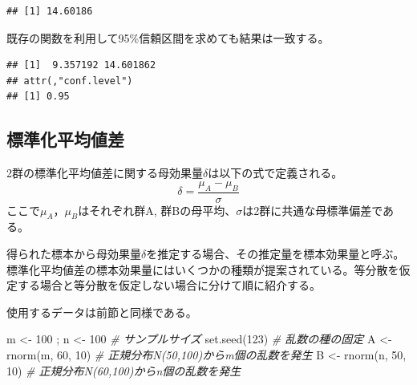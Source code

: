 \documentclass[
  ja=standard, xelatex, base=12pt]{bxjsreport}
\newenvironment{Shaded}{\begin{snugshade}}{\end{snugshade}}
\newcommand{\AttributeTok}[1]{\textcolor[rgb]{0.77,0.63,0.00}{#1}}
\newcommand{\CommentTok}[1]{\textcolor[rgb]{0.56,0.35,0.01}{\textit{#1}}}
\newcommand{\DecValTok}[1]{\textcolor[rgb]{0.00,0.00,0.81}{#1}}
\newcommand{\FunctionTok}[1]{\textcolor[rgb]{0.00,0.00,0.00}{#1}}
\newcommand{\NormalTok}[1]{#1}
\newcommand{\OtherTok}[1]{\textcolor[rgb]{0.56,0.35,0.01}{#1}}
\newcommand{\SpecialCharTok}[1]{\textcolor[rgb]{0.00,0.00,0.00}{#1}}
\begin{document}
\begin{verbatim}
## [1] 14.60186
\end{verbatim}

既存の関数を利用して95\%信頼区間を求めても結果は一致する。

\begin{Shaded}
\end{Shaded}

\begin{verbatim}
## [1]  9.357192 14.601862
## attr(,"conf.level")
## [1] 0.95
\end{verbatim}

\hypertarget{ux6a19ux6e96ux5316ux5e73ux5747ux5024ux5dee-2}{%
\subsection{標準化平均値差}\label{ux6a19ux6e96ux5316ux5e73ux5747ux5024ux5dee-2}}

2群の標準化平均値差に関する母効果量\(\delta\)は以下の式で定義される。 \[
\delta=\frac{μ_A-μ_B}{σ}
\]ここで\(μ_A\)，\(μ_B\)はそれぞれ群A, 群Bの母平均、\(σ\)は2群に共通な母標準偏差である。

得られた標本から母効果量\(\delta\)を推定する場合、その推定量を標本効果量と呼ぶ。 標準化平均値差の標本効果量にはいくつかの種類が提案されている。等分散を仮定する場合と等分散を仮定しない場合に分けて順に紹介する。

使用するデータは前節と同様である。

\begin{Shaded}
\begin{Highlighting}[]
\NormalTok{m }\OtherTok{\textless{}{-}} \DecValTok{100}\NormalTok{ ; n }\OtherTok{\textless{}{-}} \DecValTok{100}   \CommentTok{\# サンプルサイズ}
\FunctionTok{set.seed}\NormalTok{(}\DecValTok{123}\NormalTok{)         }\CommentTok{\# 乱数の種の固定}
\NormalTok{A }\OtherTok{\textless{}{-}} \FunctionTok{rnorm}\NormalTok{(m, }\DecValTok{60}\NormalTok{, }\DecValTok{10}\NormalTok{) }\CommentTok{\# 正規分布N(50,100)からm個の乱数を発生}
\NormalTok{B }\OtherTok{\textless{}{-}} \FunctionTok{rnorm}\NormalTok{(n, }\DecValTok{50}\NormalTok{, }\DecValTok{10}\NormalTok{) }\CommentTok{\# 正規分布N(60,100)からn個の乱数を発生}
\end{Highlighting}
\end{Shaded}
\end{document}
